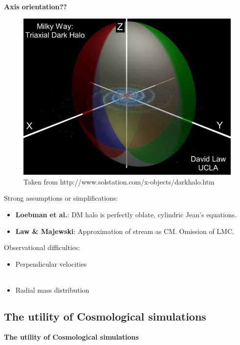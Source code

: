\documentclass[xcolor=dvipsnames]{beamer}
\begin{document}
\begin{frame}
\centering
\textbf{Axis orientation??}
\begin{figure}[c]
\includegraphics[width=0.6\linewidth]{./pics/MWDMHalo.jpg}
\caption{\tiny Taken from http://www.solstation.com/x-objects/darkhalo.htm}
\end{figure}

\end{frame}

\begin{frame}
Strong assumptions or simplifications:

\begin{itemize}
\item \textbf{Loebman et al.}: DM halo is perfectly oblate, cylindric Jean's equations.

\item \textbf{Law \& Majewski}: Approximation of stream as CM. Omission of LMC.
\end{itemize}

Observational difficulties:

\begin{itemize}
\item Perpendicular velocities\\~\\

\item Radial mass distribution
\end{itemize}

\end{frame}

\subsection{The utility of Cosmological simulations}
\begin{frame}
\centering
\LARGE
\textbf{The utility of Cosmological simulations}
\normalsize
\end{frame}
\end{document}
